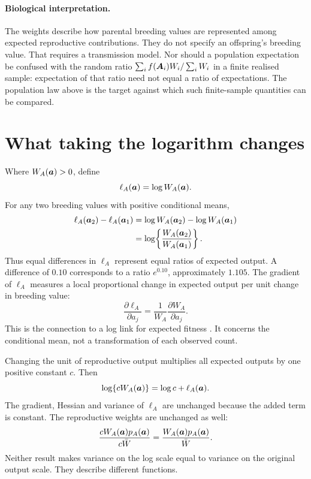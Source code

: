 \paragraph{Biological interpretation.}
The weights describe how parental breeding values are represented among
expected reproductive contributions. They do not specify an offspring's
breeding value. That requires a transmission model. Nor should a population
expectation be confused with the random ratio
\(\sum_i f(\boldsymbol{A}_i)W_i/\sum_i W_i\) in a finite realised sample: expectation
of that ratio need not equal a ratio of expectations. The population law above
is the target against which such finite-sample quantities can be compared.

\section{What taking the logarithm changes}

Where \(W_A(\boldsymbol{a})>0\), define
\begin{equation}
 \ell_A(\boldsymbol{a})=\log W_A(\boldsymbol{a}).
 \label{conditioning:log_target}
\end{equation}
For any two breeding values with positive conditional means,
\begin{align}
 \ell_A(\boldsymbol{a}_2)-\ell_A(\boldsymbol{a}_1)
 &=\log W_A(\boldsymbol{a}_2)-\log W_A(\boldsymbol{a}_1)\nonumber\\
 &=\log\!\left\{\frac{W_A(\boldsymbol{a}_2)}{W_A(\boldsymbol{a}_1)}\right\}.
 \label{conditioning:log_ratio}
\end{align}
Thus equal differences in \(\ell_A\) represent equal ratios of expected output.
A difference of \(0.10\) corresponds to a ratio \(e^{0.10}\), approximately
\(1.105\). The gradient of \(\ell_A\) measures a local proportional change in
expected output per unit change in breeding value:
\[
 \frac{\partial\ell_A}{\partial a_j}
 =\frac{1}{W_A}\frac{\partial W_A}{\partial a_j}.
\]
This is the connection to a log link for expected fitness
\citep{MorrisseyGoudie2022}. It concerns the conditional mean, not a
transformation of each observed count.

Changing the unit of reproductive output multiplies all expected outputs by
one positive constant \(c\). Then
\[
 \log\{cW_A(\boldsymbol{a})\}=\log c+\ell_A(\boldsymbol{a}).
\]
The gradient, Hessian and variance of \(\ell_A\) are unchanged because the
added term is constant. The reproductive weights are unchanged as well:
\[
 \frac{cW_A(\boldsymbol{a})p_A(\boldsymbol{a})}{c\bar W}
 =\frac{W_A(\boldsymbol{a})p_A(\boldsymbol{a})}{\bar W}.
\]
Neither result makes variance on the log scale equal to variance on the
original output scale. They describe different functions.

